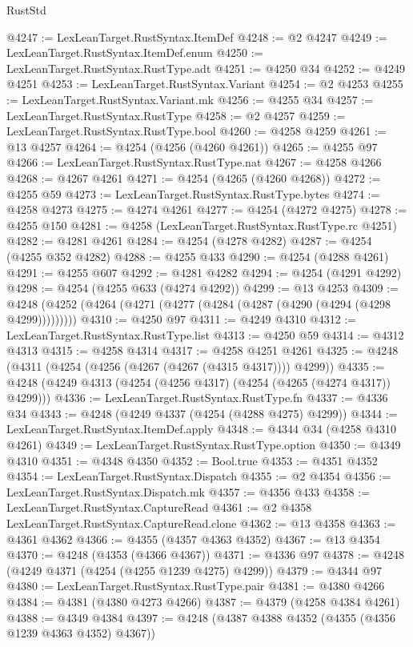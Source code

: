 \begin{lexlean}{RustStd}
\begin{coremodule}
@4247 := LexLeanTarget.RustSyntax.ItemDef
@4248 := @2 @4247
@4249 := LexLeanTarget.RustSyntax.ItemDef.enum
@4250 := LexLeanTarget.RustSyntax.RustType.adt
@4251 := @4250 @34
@4252 := @4249 @4251
@4253 := LexLeanTarget.RustSyntax.Variant
@4254 := @2 @4253
@4255 := LexLeanTarget.RustSyntax.Variant.mk
@4256 := @4255 @34
@4257 := LexLeanTarget.RustSyntax.RustType
@4258 := @2 @4257
@4259 := LexLeanTarget.RustSyntax.RustType.bool
@4260 := @4258 @4259
@4261 := @13 @4257
@4264 := @4254 (@4256 (@4260 @4261))
@4265 := @4255 @97
@4266 := LexLeanTarget.RustSyntax.RustType.nat
@4267 := @4258 @4266
@4268 := @4267 @4261
@4271 := @4254 (@4265 (@4260 @4268))
@4272 := @4255 @59
@4273 := LexLeanTarget.RustSyntax.RustType.bytes
@4274 := @4258 @4273
@4275 := @4274 @4261
@4277 := @4254 (@4272 @4275)
@4278 := @4255 @150
@4281 := @4258 (LexLeanTarget.RustSyntax.RustType.rc @4251)
@4282 := @4281 @4261
@4284 := @4254 (@4278 @4282)
@4287 := @4254 (@4255 @352 @4282)
@4288 := @4255 @433
@4290 := @4254 (@4288 @4261)
@4291 := @4255 @607
@4292 := @4281 @4282
@4294 := @4254 (@4291 @4292)
@4298 := @4254 (@4255 @633 (@4274 @4292))
@4299 := @13 @4253
@4309 := @4248 (@4252 (@4264 (@4271 (@4277 (@4284 (@4287 (@4290 (@4294 (@4298 @4299)))))))))
@4310 := @4250 @97
@4311 := @4249 @4310
@4312 := LexLeanTarget.RustSyntax.RustType.list
@4313 := @4250 @59
@4314 := @4312 @4313
@4315 := @4258 @4314
@4317 := @4258 @4251 @4261
@4325 := @4248 (@4311 (@4254 (@4256 (@4267 (@4267 (@4315 @4317)))) @4299))
@4335 := @4248 (@4249 @4313 (@4254 (@4256 @4317) (@4254 (@4265 (@4274 @4317)) @4299)))
@4336 := LexLeanTarget.RustSyntax.RustType.fn
@4337 := @4336 @34
@4343 := @4248 (@4249 @4337 (@4254 (@4288 @4275) @4299))
@4344 := LexLeanTarget.RustSyntax.ItemDef.apply
@4348 := @4344 @34 (@4258 @4310 @4261)
@4349 := LexLeanTarget.RustSyntax.RustType.option
@4350 := @4349 @4310
@4351 := @4348 @4350
@4352 := Bool.true
@4353 := @4351 @4352
@4354 := LexLeanTarget.RustSyntax.Dispatch
@4355 := @2 @4354
@4356 := LexLeanTarget.RustSyntax.Dispatch.mk
@4357 := @4356 @433
@4358 := LexLeanTarget.RustSyntax.CaptureRead
@4361 := @2 @4358 LexLeanTarget.RustSyntax.CaptureRead.clone
@4362 := @13 @4358
@4363 := @4361 @4362
@4366 := @4355 (@4357 @4363 @4352)
@4367 := @13 @4354
@4370 := @4248 (@4353 (@4366 @4367))
@4371 := @4336 @97
@4378 := @4248 (@4249 @4371 (@4254 (@4255 @1239 @4275) @4299))
@4379 := @4344 @97
@4380 := LexLeanTarget.RustSyntax.RustType.pair
@4381 := @4380 @4266
@4384 := @4381 (@4380 @4273 @4266)
@4387 := @4379 (@4258 @4384 @4261)
@4388 := @4349 @4384
@4397 := @4248 (@4387 @4388 @4352 (@4355 (@4356 @1239 @4363 @4352) @4367))

\end{coremodule}
\end{lexlean}
